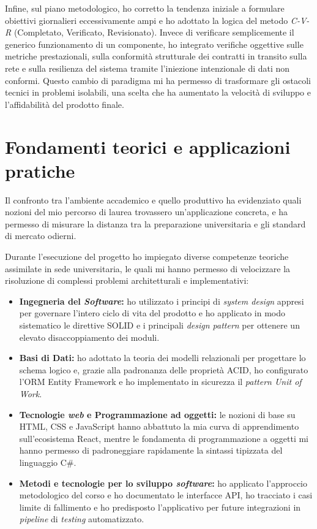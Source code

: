 Infine, sul piano metodologico, ho corretto la tendenza iniziale a formulare obiettivi giornalieri eccessivamente ampi e ho adottato la logica del metodo \textit{C-V-R} (Completato, Verificato, Revisionato). Invece di verificare semplicemente il generico funzionamento di un componente, ho integrato verifiche oggettive sulle metriche prestazionali, sulla conformità strutturale dei contratti in transito sulla rete e sulla resilienza del sistema tramite l'iniezione intenzionale di dati non conformi. Questo cambio di paradigma mi ha permesso di trasformare gli ostacoli tecnici in problemi isolabili, una scelta che ha aumentato la velocità di sviluppo e l'affidabilità del prodotto finale.

\section{Fondamenti teorici e applicazioni pratiche}
Il confronto tra l'ambiente accademico e quello produttivo ha evidenziato quali nozioni del mio percorso di laurea trovassero un'applicazione concreta, e ha permesso di misurare la distanza tra la preparazione universitaria e gli standard di mercato odierni.

Durante l'esecuzione del progetto ho impiegato diverse competenze teoriche assimilate in sede universitaria, le quali mi hanno permesso di velocizzare la risoluzione di complessi problemi architetturali e implementativi:
\begin{itemize}
    \item \textbf{Ingegneria del \textit{Software}:} ho utilizzato i principi di \textit{system design} appresi per governare l'intero ciclo di vita del prodotto e ho applicato in modo sistematico le direttive SOLID e i principali \textit{design pattern} per ottenere un elevato disaccoppiamento dei moduli.
    \item \textbf{Basi di Dati:} ho adottato la teoria dei modelli relazionali per progettare lo schema logico e, grazie alla padronanza delle proprietà ACID, ho configurato l'ORM Entity Framework e ho implementato in sicurezza il \textit{pattern Unit of Work}.
    \item \textbf{Tecnologie \textit{web} e Programmazione ad oggetti:} le nozioni di base su HTML, CSS e JavaScript hanno abbattuto la mia curva di apprendimento sull'ecosistema React, mentre le fondamenta di programmazione a oggetti mi hanno permesso di padroneggiare rapidamente la sintassi tipizzata del linguaggio C\#.
    \item \textbf{Metodi e tecnologie per lo sviluppo \textit{software}:} ho applicato l'approccio metodologico del corso e ho documentato le interfacce API, ho tracciato i casi limite di fallimento e ho predisposto l'applicativo per future integrazioni in \textit{pipeline} di \textit{testing} automatizzato.
\end{itemize}

